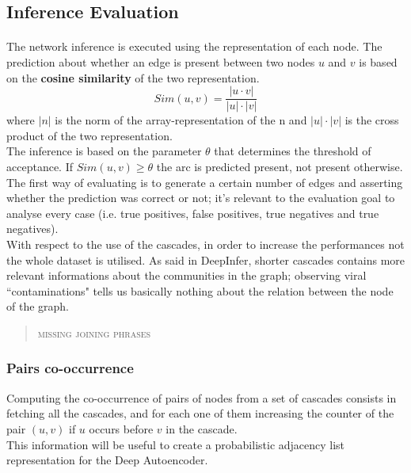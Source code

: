 \documentclass{article}
\begin{document}
		\subsection{Inference Evaluation}
			\paragraph{}
			The network inference is executed using the representation of each node. The prediction about whether an edge is present between two nodes $u$ and $v$ is based on the \textbf{cosine similarity} of the two representation.
			$$ Sim(u,v) = \frac{|u\cdot v|}{|u|\cdot |v|} $$
			where $|n|$ is the norm of the array-representation of the n and $|u|\cdot |v|$ is the cross product of the two representation.\\
			The inference is based on the parameter $\theta$ that determines the threshold of acceptance. If $Sim(u,v) \ge \theta$ the arc is predicted present, not present otherwise.\\
			The first way of evaluating is to generate a certain number of edges and asserting whether the prediction was correct or not; it's relevant to the evaluation goal to analyse every case (i.e. true positives, false positives, true negatives and true negatives).\medskip\\

			With respect to the use of the cascades, in order to increase the performances not the whole dataset is utilised. As said in DeepInfer, shorter cascades contains more relevant informations about the communities in the graph; observing viral \textquotedblleft contaminations" tells us basically nothing about the relation between the node of the graph. \\
			\begin{quote}
				\centering
				\textsc{missing joining phrases}\\
			\end{quote}
			\subsubsection{Pairs co-occurrence}
			Computing the co-occurrence of pairs of nodes from a set of cascades consists in fetching all the cascades, and for each one of them increasing the counter of the pair $(u,v)$ if $u$ occurs before $v$ in the cascade.\\
			This information will be useful to create a probabilistic adjacency list representation for the Deep Autoencoder.
\end{document}
